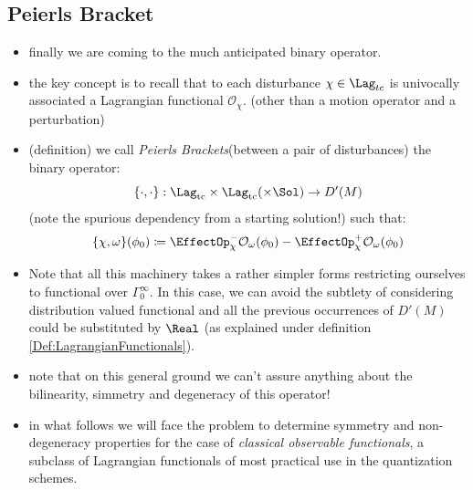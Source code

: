 \documentclass[a4paper,11pt]{scrartcl}
\begin{document}
    \subsection{Peierls Bracket}
    \begin{itemize}
        \item finally we are coming to the much anticipated binary operator.
        \item the key concept is to recall that to each disturbance $\chi \in \Lag_{tc} $ is univocally associated a Lagrangian functional $\mathcal{O}_\chi$. (other than a motion operator and a perturbation)
        \item (definition) we call \emph{Peierls Brackets}(between a pair of disturbances) the binary operator:
        $$ \{\cdot,\cdot\}:\Lag_{\textrm{tc}} \times \Lag_{\textrm{tc}} ( \times \Sol) \rightarrow D'(M) $$
        (note the spurious dependency from a starting solution!)
        such that:
        $$
                \{\chi, \omega \}(\phi_0) \coloneqq \EffectOp_\chi^- \mathcal{O}_\omega (\phi_0) - \EffectOp_\chi^+ \mathcal{O}_\omega(\phi_0)
        $$
        \item Note that all this machinery takes a rather simpler forms restricting ourselves to functional over $\Gamma_0^\infty$. 
        In this case, we can avoid the subtlety of considering distribution valued functional and all the previous occurrences of $D'(M)$ could be substituted by $\Real$ (as explained under definition \ref{Def:LagrangianFunctionals}).
        \item note that on this general ground we can't  assure anything about the bilinearity, simmetry and degeneracy of this operator!
        \item in what follows we will face the problem to determine  symmetry and non-degeneracy properties for the case of  \emph{classical observable functionals}, a subclass of Lagrangian functionals of most practical use in the quantization schemes.        
    \end{itemize}
\end{document}
